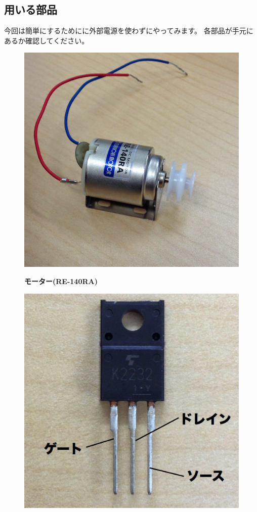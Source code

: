 \documentclass[11pt,a4paper]{jarticle}
\begin{document}
\subsection*{用いる部品}
今回は簡単にするためにに外部電源を使わずにやってみます。
各部品が手元にあるか確認してください。
\begin{figure}[h!]
 \begin{minipage}{0.32\columnwidth}
  \centering
  \includegraphics[width=\columnwidth]{img/motor.eps}
  \begin{center}
   \textbf{モーター(RE-140RA)}
  \end{center}
 \end{minipage}
 \begin{minipage}{0.32\columnwidth}
  \centering
  \includegraphics[width=\columnwidth]{img/fet.eps}

\end{minipage}
\end{figure}
\end{document}
